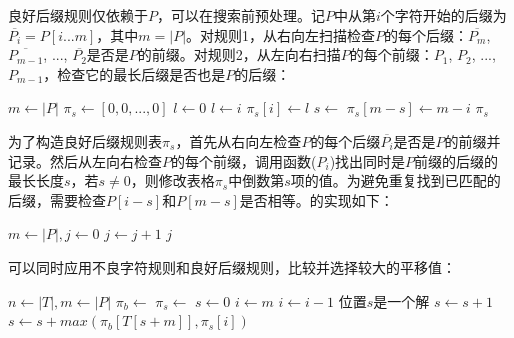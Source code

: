 \documentclass[b5paper]{ctexart}
\begin{document}
良好后缀规则仅依赖于$P$，可以在搜索前预处理。记$P$中从第$i$个字符开始的后缀为$\overline{P_i} = P[i...m]$，其中$m = |P|$。对规则1，从右向左扫描检查$P$的每个后缀：$\overline{P_m}$, $\overline{P_{m-1}}$, ...,  $\overline{P_2}$是否是$P$的前缀。对规则2，从左向右扫描$P$的每个前缀：$P_1$, $P_2$, ..., $P_{m-1}$，检查它的最长后缀是否也是$P$的后缀：

\begin{algorithmic}[1]
  \State $m \gets |P|$
  \State $\pi_s \gets [0, 0, ..., 0]$ 
  \State $l \gets 0$                  
       
     
      \State $l \gets i$
    \EndIf
    \State $\pi_s[i] \gets l$
  \EndFor
   
    \State $s \gets$ 
      \State $\pi_s[m - s] \gets m - i$
    \EndIf
  \EndFor
  \State \Return $\pi_s$
\EndFunction
\end{algorithmic}

为了构造良好后缀规则表$\pi_s$，首先从右向左检查$P$的每个后缀$\overline{P_i}$是否是$P$的前缀并记录。然后从左向右检查$P$的每个前缀，调用函数($P_i$)找出同时是$P$前缀的后缀的最长长度$s$，若$s \neq 0$，则修改表格$\pi_s$中倒数第$s$项的值。为避免重复找到已匹配的后缀，需要检查$P[i - s]$和$P[m - s]$是否相等。的实现如下：

\begin{algorithmic}[1]
  \State $m \gets |P|, j \gets 0$
    \State $j \gets j + 1$
  \EndWhile
  \State \Return $j$
\EndFunction
\end{algorithmic}

可以同时应用不良字符规则和良好后缀规则，比较并选择较大的平移值：

\begin{algorithmic}[1]
  \State $n \gets |T|, m \gets |P|$
  \State $\pi_b \gets$ 
  \State $\pi_s \gets$ 
  \State $s \gets 0$
    \State $i \gets m$
      \State $i \gets i - 1$
    \EndWhile
      \State 位置$s$是一个解
      \State $s \gets s + 1$ 
    \Else
      \State $s \gets s + max(\pi_b[T[s + m]], \pi_s[i])$
    \EndIf
  \EndWhile
\EndFunction
\end{algorithmic}
\end{document}
